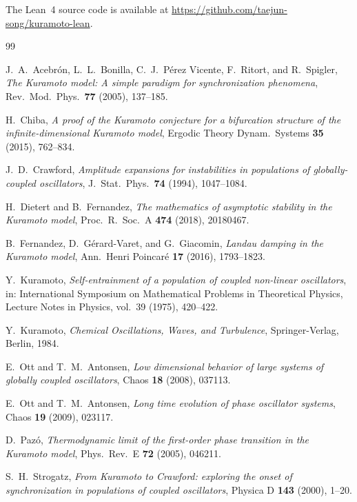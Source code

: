 \documentclass[12pt]{article}
\theoremstyle{definition}
\begin{document}
The Lean~4 source code is available at
\url{https://github.com/taejun-song/kuramoto-lean}.

\begin{thebibliography}{99}

J.~A.~Acebr\'on, L.~L.~Bonilla, C.~J.~P\'erez Vicente, F.~Ritort, and R.~Spigler,
\emph{The Kuramoto model: A simple paradigm for synchronization phenomena},
Rev.\ Mod.\ Phys.\ \textbf{77} (2005), 137--185.

H.~Chiba,
\emph{A proof of the Kuramoto conjecture for a bifurcation structure of the infinite-dimensional Kuramoto model},
Ergodic Theory Dynam.\ Systems \textbf{35} (2015), 762--834.

J.~D.~Crawford,
\emph{Amplitude expansions for instabilities in populations of globally-coupled oscillators},
J.\ Stat.\ Phys.\ \textbf{74} (1994), 1047--1084.

H.~Dietert and B.~Fernandez,
\emph{The mathematics of asymptotic stability in the Kuramoto model},
Proc.\ R.\ Soc.\ A \textbf{474} (2018), 20180467.

B.~Fernandez, D.~G\'erard-Varet, and G.~Giacomin,
\emph{Landau damping in the Kuramoto model},
Ann.\ Henri Poincar\'e \textbf{17} (2016), 1793--1823.

Y.~Kuramoto,
\emph{Self-entrainment of a population of coupled non-linear oscillators},
in: International Symposium on Mathematical Problems in Theoretical Physics,
Lecture Notes in Physics, vol.~39 (1975), 420--422.

Y.~Kuramoto,
\emph{Chemical Oscillations, Waves, and Turbulence},
Springer-Verlag, Berlin, 1984.

E.~Ott and T.~M.~Antonsen,
\emph{Low dimensional behavior of large systems of globally coupled oscillators},
Chaos \textbf{18} (2008), 037113.

E.~Ott and T.~M.~Antonsen,
\emph{Long time evolution of phase oscillator systems},
Chaos \textbf{19} (2009), 023117.

D.~Paz\'o,
\emph{Thermodynamic limit of the first-order phase transition in the Kuramoto model},
Phys.\ Rev.\ E \textbf{72} (2005), 046211.

S.~H.~Strogatz,
\emph{From Kuramoto to Crawford: exploring the onset of synchronization in populations of coupled oscillators},
Physica D \textbf{143} (2000), 1--20.

\end{thebibliography}
\end{document}
